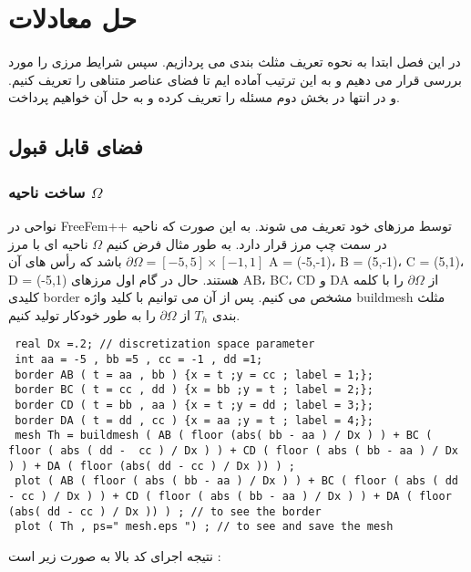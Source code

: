 \chapter{حل معادلات}
در این فصل ابتدا به نحوه تعریف مثلث بندی می پردازیم. سپس شرایط مرزی را مورد بررسی قرار می دهیم و به این ترتیب آماده ایم تا فضای عناصر متناهی را تعریف کنیم. و در انتها در بخش دوم مسئله را تعریف کرده و به حل آن خواهیم پرداخت.

\section{فضای قابل قبول}
\subsection{ساخت ناحیه $\Omega$}
نواحی در FreeFem++ توسط مرزهای خود تعریف می شوند. به این صورت که ناحیه در سمت چپ مرز قرار دارد. به طور مثال فرض کنیم $\Omega$ ناحیه ای با مرز $ \partial\Omega = [-5,5]\times[-1,1] $ باشد که رأس های آن  A = (-5,-1)، B = (5,-1)، C = (5,1)، D = (-5,1) هستند. حال در گام اول مرزهای AB، BC، CD و DA از $ \partial\Omega $ را با کلمه کلیدی  border مشخص می کنیم. پس از آن می توانیم با کلید واژه buildmesh مثلث بندی $T_{h}$ از $\partial\Omega$ را به طور خودکار تولید کنیم.
\begin{LTR}
	\begin{lstlisting}
 real Dx =.2; // discretization space parameter
 int aa = -5 , bb =5 , cc = -1 , dd =1;
 border AB ( t = aa , bb ) {x = t ;y = cc ; label = 1;};
 border BC ( t = cc , dd ) {x = bb ;y = t ; label = 2;};
 border CD ( t = bb , aa ) {x = t ;y = dd ; label = 3;};
 border DA ( t = dd , cc ) {x = aa ;y = t ; label = 4;};
 mesh Th = buildmesh ( AB ( floor (abs( bb - aa ) / Dx ) ) + BC ( floor ( abs ( dd -  cc ) / Dx ) ) + CD ( floor ( abs ( bb - aa ) / Dx ) ) + DA ( floor (abs( dd - cc ) / Dx )) ) ;
 plot ( AB ( floor ( abs ( bb - aa ) / Dx ) ) + BC ( floor ( abs ( dd - cc ) / Dx ) ) + CD ( floor ( abs ( bb - aa ) / Dx ) ) + DA ( floor (abs( dd - cc ) / Dx )) ) ; // to see the border
 plot ( Th , ps=" mesh.eps ") ; // to see and save the mesh
	\end{lstlisting}
\end{LTR} 
نتیجه اجرای کد بالا به صورت زیر است :

